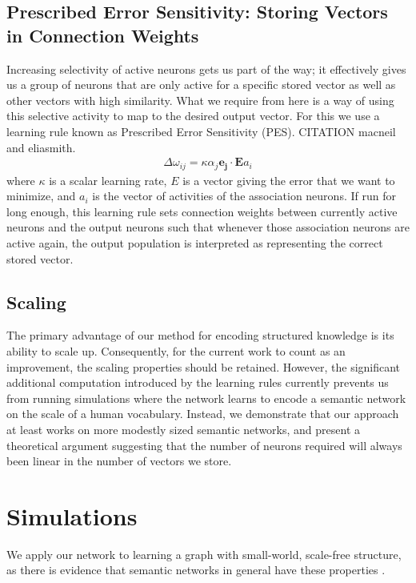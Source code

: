 \documentclass[10pt,letterpaper]{article}
\begin{document}
\subsection{Prescribed Error Sensitivity: Storing Vectors in Connection Weights}
Increasing selectivity of active neurons gets us part of the way; it effectively gives us a group of neurons that are only active for a specific stored vector as well as other vectors with high similarity. What we require from here is a way of using this selective activity to map to the desired output vector. For this we use a learning rule known as Prescribed Error Sensitivity (PES). CITATION macneil and eliasmith. 
\begin{align}
\Delta \omega_{ij} = \kappa \alpha_j \mathbf{e_j} \cdot \mathbf{E}a_i
\end{align}
where $\kappa$ is a scalar learning rate, $E$ is a vector giving the error that we want to minimize, and $a_i$ is the vector of activities of the association neurons. If run for long enough, this learning rule sets connection weights between currently active neurons and the output neurons such that whenever those association neurons are active again, the output population is interpreted as representing the correct stored vector. 

\subsection{Scaling}
The primary advantage of our method for encoding structured knowledge is its ability to scale up. Consequently, for the current work to count as an improvement, the scaling properties should be retained. However, the significant additional computation introduced by the learning rules currently prevents us from running simulations where the network learns to encode a semantic network on the scale of a human vocabulary. Instead, we demonstrate that our approach at least works on more modestly sized semantic networks, and present a theoretical argument suggesting that the number of neurons required will always been linear in the number of vectors we store. 

\section{Simulations}

We apply our network to learning a graph with small-world, scale-free structure, as there is evidence that semantic networks in general have these properties \citep{Tenenbaum2005}.
\end{document}
